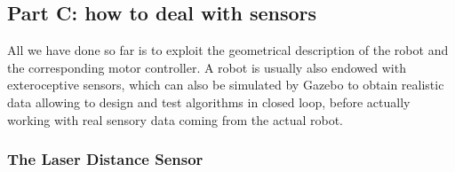 \documentclass[10pt,a4paper]{upmc}
\begin{document}
\subsection{Part C: how to deal with sensors}

All we have done so far is to exploit the geometrical description of the robot and the corresponding
motor controller. A robot is usually also endowed with exteroceptive sensors, which can also be
simulated by Gazebo to obtain realistic data allowing to design and test algorithms in closed loop,
before actually working with real sensory data coming from the actual robot.

\subsubsection{The Laser Distance Sensor}
\end{document}

